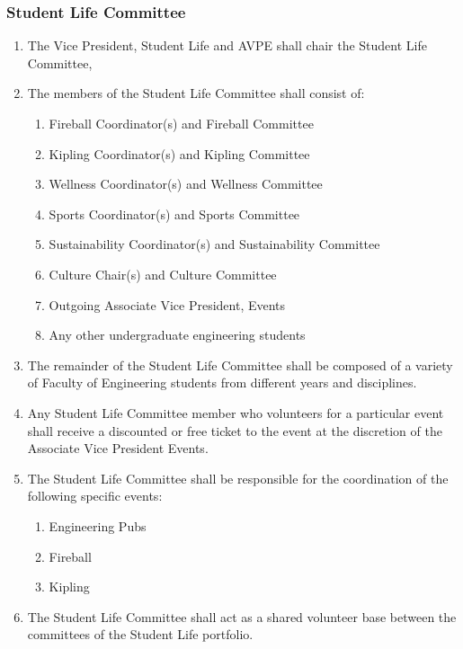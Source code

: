 \subsubsection{Student Life Committee}
\label{student-life-committee}
\begin{enumerate}
 \item
  The Vice President, Student Life and AVPE shall chair the Student Life Committee,
 \item
  The members of the Student Life Committee shall consist of:

  \begin{enumerate}
   \item
    Fireball Coordinator(s) and Fireball Committee
   \item
    Kipling Coordinator(s) and Kipling Committee
   \item
    Wellness Coordinator(s) and Wellness Committee
   \item
    Sports Coordinator(s) and Sports Committee
   \item
    Sustainability Coordinator(s) and Sustainability Committee
   \item
    Culture Chair(s) and Culture Committee
   \item
    Outgoing Associate Vice President, Events
   \item
    Any other undergraduate engineering students
  \end{enumerate}
 \item
  The remainder of the Student Life Committee shall be composed of a variety of Faculty of Engineering students from different years and disciplines.
 \item
  Any Student Life Committee member who volunteers for a particular event shall receive a discounted or free ticket to the event at the discretion of the Associate Vice President Events.
 \item
  The Student Life Committee shall be responsible for the coordination of the following specific events:

  \begin{enumerate}
   \item
    Engineering Pubs
   \item
    Fireball
   \item
    Kipling

  \end{enumerate}
 \item
  The Student Life Committee shall act as a shared volunteer base between the committees of the Student Life portfolio.
\end{enumerate}

